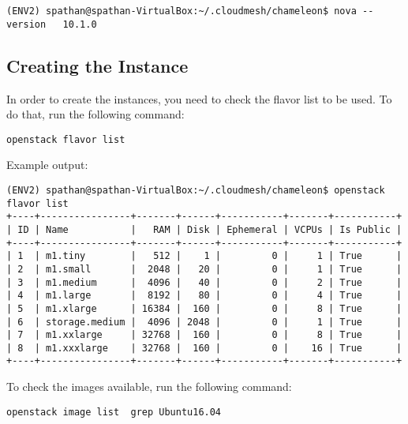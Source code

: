 \texttt{(ENV2)\ spathan@spathan-VirtualBox:\textasciitilde{}/.cloudmesh/chameleon\$\ nova\ -\/-version\ \ \ 10.1.0}

\subsection{Creating the Instance}

In order to create the instances, you need to check the flavor list to
be used. To do that, run the following command:

\texttt{openstack\ flavor\ list}

Example output:

\begin{lstlisting}
(ENV2) spathan@spathan-VirtualBox:~/.cloudmesh/chameleon$ openstack flavor list
+----+----------------+-------+------+-----------+-------+-----------+
| ID | Name           |   RAM | Disk | Ephemeral | VCPUs | Is Public |
+----+----------------+-------+------+-----------+-------+-----------+
| 1  | m1.tiny        |   512 |    1 |         0 |     1 | True      |
| 2  | m1.small       |  2048 |   20 |         0 |     1 | True      |
| 3  | m1.medium      |  4096 |   40 |         0 |     2 | True      |
| 4  | m1.large       |  8192 |   80 |         0 |     4 | True      |
| 5  | m1.xlarge      | 16384 |  160 |         0 |     8 | True      |
| 6  | storage.medium |  4096 | 2048 |         0 |     1 | True      |
| 7  | m1.xxlarge     | 32768 |  160 |         0 |     8 | True      |
| 8  | m1.xxxlarge    | 32768 |  160 |         0 |    16 | True      |
+----+----------------+-------+------+-----------+-------+-----------+
\end{lstlisting}

To check the images available, run the following command:

\texttt{openstack\ image\ list\ \textbar{}\ grep\ \textquotesingle{}Ubuntu16.04\textquotesingle{}}

